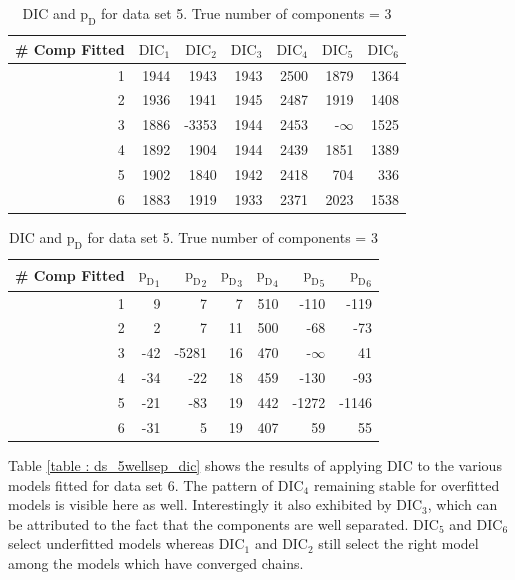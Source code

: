 \begin{table}[!htb]
\centering
\captionsetup{justification=centering}
\caption{DIC and $\text{p}_\text{D}$ for data set 5. True number of components = 3}
\label{table : ds_3fused_3ppg_dic}
\begin{tabular}{@{}rrrrrrr@{}}
\toprule
\# Comp Fitted & $\text{DIC}_1$ & $\text{DIC}_2$  & $\text{DIC}_3$  & $\text{DIC}_4$  & $\text{DIC}_5$  & $\text{DIC}_6$  \\ \midrule
1 & 1944 & 1943 & 1943 & 2500 & 1879 & 1364 \\
2 & 1936 & 1941 & 1945 & 2487 & 1919 & 1408 \\
3 & 1886 & -3353 & 1944 & 2453 & -$\infty$ & 1525 \\
4 & 1892 & 1904 & 1944 & 2439 & 1851 & 1389 \\
5 & 1902 & 1840 & 1942 & 2418 & 704 & 336 \\
6 & 1883 & 1919 & 1933 & 2371 & 2023 & 1538 \\ \bottomrule
\end{tabular}

\begin{tabular}{@{}rrrrrrr@{}}
\toprule
\# Comp Fitted & ${\text{p}_\text{D}}_1$ & ${\text{p}_\text{D}}_2$ & ${\text{p}_\text{D}}_3$ & ${\text{p}_\text{D}}_4$ & ${\text{p}_\text{D}}_5$ & ${\text{p}_\text{D}}_6$ \\ \midrule
1 & 9 & 7 & 7 & 510 & -110 & -119 \\
2 & 2 & 7 & 11 & 500 & -68 & -73 \\
3 & -42 & -5281 & 16 & 470 & -$\infty$ & 41 \\
4 & -34 & -22 & 18 & 459 & -130 & -93 \\
5 & -21 & -83 & 19 & 442 & -1272 & -1146 \\
6 & -31 & 5 & 19 & 407 & 59 & 55 \\ \bottomrule
\end{tabular}
\end{table}

Table \ref{table : ds_5wellsep_dic} shows the results of applying DIC to the various models fitted for data set 6. The pattern of $\text{DIC}_4$ remaining stable for overfitted models is visible here as well. Interestingly it also exhibited by $\text{DIC}_3$, which can be attributed to the fact that the components are well separated. $\text{DIC}_5$ and $\text{DIC}_6$ select underfitted models whereas $\text{DIC}_1$ and $\text{DIC}_2$ still select the right model among the models which have converged chains.\\

